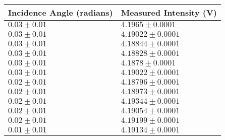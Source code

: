 \begin{tabular}{| p{} | p{} |}
\hline
Incidence Angle (radians) & Measured Intensity (V)\\
\hline
$0.03 \pm 0.01$ & $4.1965 \pm 0.0001$\\
$0.03 \pm 0.01$ & $4.19022 \pm 0.0001$\\
$0.03 \pm 0.01$ & $4.18844 \pm 0.0001$\\
$0.03 \pm 0.01$ & $4.18828 \pm 0.0001$\\
$0.03 \pm 0.01$ & $4.1878 \pm 0.0001$\\
$0.03 \pm 0.01$ & $4.19022 \pm 0.0001$\\
$0.02 \pm 0.01$ & $4.18796 \pm 0.0001$\\
$0.02 \pm 0.01$ & $4.18973 \pm 0.0001$\\
$0.02 \pm 0.01$ & $4.19344 \pm 0.0001$\\
$0.02 \pm 0.01$ & $4.19054 \pm 0.0001$\\
$0.02 \pm 0.01$ & $4.19199 \pm 0.0001$\\
$0.01 \pm 0.01$ & $4.19134 \pm 0.0001$\\
\hline
\end{tabular}